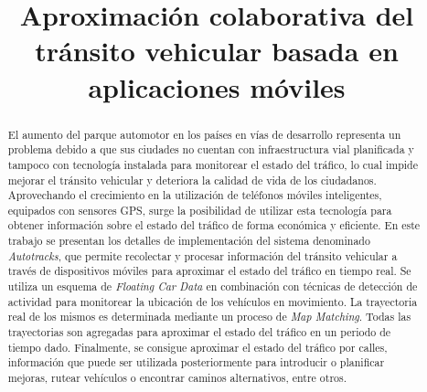 \documentclass[conference,spanish]{IEEEtran}
\begin{document}
    \renewcommand{\lstlistingname}{\textbf{Consulta}}
    \renewcommand\tablename{Tabla}
  
	\title{Aproximación colaborativa del tránsito vehicular basada en aplicaciones móviles}
	
	\author{
		\and
		\and
		}

	\maketitle
	
	\begin{abstract}
El aumento del parque automotor en los países en vías de desarrollo representa un problema debido a que sus ciudades no cuentan con infraestructura vial planificada y tampoco con tecnología instalada para monitorear el estado del tráfico, lo cual impide mejorar el tránsito vehicular y deteriora la calidad de vida de los ciudadanos. Aprovechando el crecimiento en la utilización de teléfonos móviles inteligentes, equipados con sensores GPS, surge la posibilidad de utilizar esta tecnología para obtener información sobre el estado del tráfico de forma económica y eficiente. En este trabajo se presentan los detalles de implementación del sistema denominado \emph{Autotracks}, que permite recolectar y procesar información del tránsito vehicular a través de dispositivos móviles para aproximar el estado del tráfico en tiempo real. Se utiliza un esquema de \emph{Floating Car Data} en combinación con técnicas de detección de actividad para monitorear la ubicación de los vehículos en movimiento. La trayectoria real de los mismos es determinada mediante un proceso de \emph{Map Matching}. Todas las trayectorias son agregadas para aproximar el estado del tráfico en un periodo de tiempo dado. Finalmente, se consigue aproximar el estado del tráfico por calles, información que puede ser utilizada posteriormente para introducir o planificar mejoras, rutear vehículos o encontrar caminos alternativos, entre otros.
	\end{abstract}
	
\end{document}
